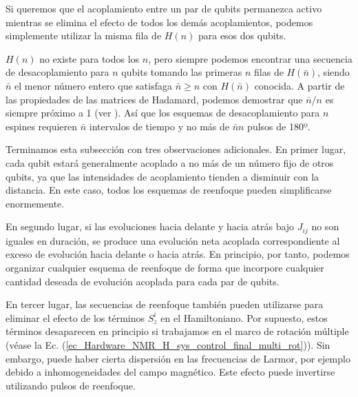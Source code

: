 Si queremos que el acoplamiento entre un par de qubits permanezca activo mientras se elimina el efecto de todos los demás acoplamientos, podemos simplemente utilizar la misma fila de $H(n)$ para esos dos qubits. 

$H(n)$ no existe para todos los $n$, pero siempre podemos encontrar una secuencia de desacoplamiento para $n$ qubits tomando las primeras $n$ filas de $H(\bar{n})$, siendo $\bar{n}$ el menor número entero que satisfaga $\bar{n} \geq n $ con $H(\bar{n})$ conocida. A partir de las propiedades de las matrices de Hadamard, podemos demostrar que $\bar{n}/n$ es siempre próximo a 1 (ver \cite{bib_Hardware_NMR_reenfoque_Hadammard_1}). Así que los esquemas de desacoplamiento para $n$ espines requieren $\bar{n}$ intervalos de tiempo y no más de $\bar{n}n$ pulsos de 180º.

Terminamos esta subsección con tres observaciones adicionales.
En primer lugar, cada qubit estará generalmente acoplado a no más de un número fijo de otros qubits, ya que las intensidades de acoplamiento tienden a disminuir con la distancia. En este caso, todos los esquemas de reenfoque pueden simplificarse enormemente. 

En segundo lugar, si las evoluciones hacia delante y hacia atrás bajo
$J_{ij}$ no son iguales en duración, se produce una evolución neta acoplada correspondiente al exceso de evolución hacia delante o hacia atrás. En principio, por tanto, podemos organizar cualquier esquema de reenfoque de forma que incorpore cualquier cantidad deseada de evolución acoplada para cada par de qubits.

En tercer lugar, las secuencias de reenfoque también pueden utilizarse para eliminar el efecto de los términos $S_{z}^i$ en el Hamiltoniano. Por supuesto, estos términos desaparecen en principio si trabajamos en el marco de rotación múltiple (véase la Ec. (\ref{ec_Hardware_NMR_H_sys_control_final_multi_rot})). Sin embargo, puede haber cierta dispersión en las frecuencias de Larmor, por ejemplo debido a inhomogeneidades del campo magnético. Este efecto puede invertirse utilizando pulsos de reenfoque.





\nocite{*}


















